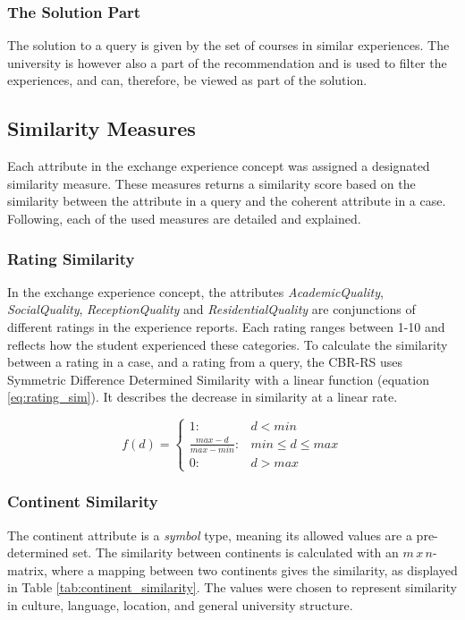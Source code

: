 \subsubsection{The Solution Part}
The solution to a query is given by the set of courses in similar experiences. The university is however also a part of the recommendation and is used to filter the experiences, and can, therefore, be viewed as part of the solution.

\subsection{Similarity Measures}
Each attribute in the exchange experience concept was assigned a designated similarity measure. These measures returns a similarity score based on the similarity between the attribute in a query and the coherent attribute in a case. Following, each of the used measures are detailed and explained.


\subsubsection{Rating Similarity} 

In the exchange experience concept, the attributes \emph{AcademicQuality}, \emph{SocialQuality}, \emph{ReceptionQuality} and \emph{ResidentialQuality} are conjunctions of different ratings in the experience reports. Each rating ranges between 1-10 and reflects how the student experienced these categories. To calculate the similarity between a rating in a case, and a rating from a query, the CBR-RS uses Symmetric Difference Determined Similarity \cite{bergmann2002experience} with a linear function (equation \ref{eq:rating_sim}). It describes the decrease in similarity at a linear rate.


\begin{equation} \label{eq:rating_sim}
    f(d) = 
    \begin{cases} 1 : & d < min \\ 
    \frac{max-d}{max-min} : & min \leq d \leq max \\
    0 : & d > max
    \end{cases}
\end{equation}


\subsubsection{Continent Similarity} 

The continent attribute is a \textit{symbol} type, meaning its allowed values are a pre-determined set. The similarity between continents is calculated with an $m \, x \, n$-matrix, where a mapping between two continents gives the similarity, as displayed in Table \ref{tab:continent_similarity}. The values were chosen to represent similarity in culture, language, location, and general university structure.

